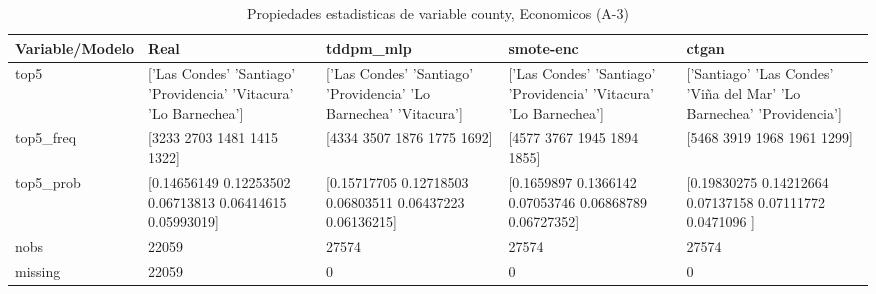 \begin{table}[H]
\centering
\fontsize{8}{14}\selectfont
\caption{Propiedades  estadisticas de variable county, Economicos (A-3)}
\label{table-stats-economicos-a-3-county}
\begin{tabular}{|l|m{10em}|m{10em}|m{10em}|m{10em}|}
\hline
 \rowcolor[gray]{0.8}
Variable/Modelo & Real & tddpm\_mlp & smote-enc & ctgan \\
\hline top5 & ['Las Condes' 'Santiago' 'Providencia' 'Vitacura' 'Lo Barnechea'] & ['Las Condes' 'Santiago' 'Providencia' 'Lo Barnechea' 'Vitacura'] & ['Las Condes' 'Santiago' 'Providencia' 'Vitacura' 'Lo Barnechea'] & ['Santiago' 'Las Condes' 'Viña del Mar' 'Lo Barnechea' 'Providencia'] \\
\hline top5\_freq & [3233 2703 1481 1415 1322] & [4334 3507 1876 1775 1692] & [4577 3767 1945 1894 1855] & [5468 3919 1968 1961 1299] \\
\hline top5\_prob & [0.14656149 0.12253502 0.06713813 0.06414615 0.05993019] & [0.15717705 0.12718503 0.06803511 0.06437223 0.06136215] & [0.1659897  0.1366142  0.07053746 0.06868789 0.06727352] & [0.19830275 0.14212664 0.07137158 0.07111772 0.0471096 ] \\
\hline nobs & 22059 & 27574 & 27574 & 27574 \\
\hline missing & 22059 & 0 & 0 & 0 \\
\hline
\end{tabular}
\end{table}
